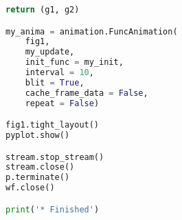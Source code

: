 \documentclass[11pt]{article}
\begin{document}
\begin{lstlisting}[language=python, label={lst:code}, breaklines=true, caption={Full implementation}]
    return (g1, g2)

my_anima = animation.FuncAnimation(
    fig1,
    my_update,
    init_func = my_init,
    interval = 10,
    blit = True,
    cache_frame_data = False,
    repeat = False)

fig1.tight_layout()
pyplot.show()

stream.stop_stream()
stream.close()
p.terminate()
wf.close()

print('* Finished')
    \end{lstlisting}   
\end{document}
